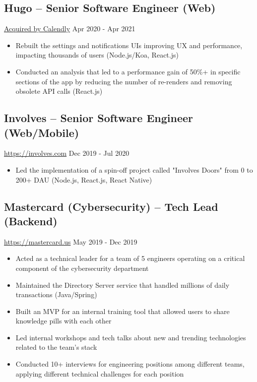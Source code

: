 \documentclass[11pt, a4paper]{article}
\begin{document}
\subsection*{Hugo -- Senior Software Engineer (Web)}
\href{https://www.linkedin.com/company/hugo-team/}{Acquired by Calendly} \hfill Apr 2020 - Apr 2021
\begin{itemize}[noitemsep]
    \item Rebuilt the settings and notifications UIs improving UX and performance, impacting thousands of users (Node.js/Koa, React.js)
    \item Conducted an analysis that led to a performance gain of 50\%+ in specific sections of the app by reducing the number of re-renders and removing obsolete API calls (React.js)
\end{itemize}

\subsection*{Involves -- Senior Software Engineer (Web/Mobile)}
\href{https://involves.com/}{https://involves.com} \hfill Dec 2019 - Jul 2020
\begin{itemize}[noitemsep]
    \item Led the implementation of a spin-off project called "Involves Doors" from 0 to 200+ DAU (Node.js, React.js, React Native)
\end{itemize}

\subsection*{Mastercard (Cybersecurity) -- Tech Lead (Backend)}
\href{https://www.mastercard.us/en-us.html}{https://mastercard.us} \hfill May 2019 - Dec 2019
\begin{itemize}[noitemsep]
    \item Acted as a technical leader for a team of 5 engineers operating on a critical component of the cybersecurity department
    \item Maintained the Directory Server service that handled millions of daily transactions (Java/Spring)
    \item Built an MVP for an internal training tool that allowed users to share knowledge pills with each other
    \item Led internal workshops and tech talks about new and trending technologies related to the team's stack
    \item Conducted 10+ interviews for engineering positions among different teams, applying different technical challenges for each position
\end{itemize}
\end{document}

